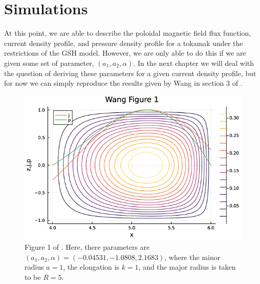 \section{Simulations}
At this point, we are able to describe the poloidal magnetic field flux function, current density profile, and pressure density profile for a 
tokamak under the restrictions of the GSH model. However, we are only able to do this if we are given some set of parameter, $(a_1, a_2, \alpha)$. 
In the next chapter we will deal with the question of deriving these parameters for a given current density profile, but for now we can simply reproduce 
the results given by Wang in section 3 of \cite{wang-analytic-solution}.

\begin{figure}[h!]
    \centering
    \includegraphics[scale=0.7]{imgs/c3/wang-fig-1.png}
    \caption{Figure 1 of \cite{wang-analytic-solution}. Here, there parameters are $(a_1, a_2, \alpha) = (-0.04531, -1.0808, 2.1683)$, 
    where the minor radius $a = 1$, the elongation is $k = 1$, and the major radius is taken to be $R = 5$.}
\end{figure}
